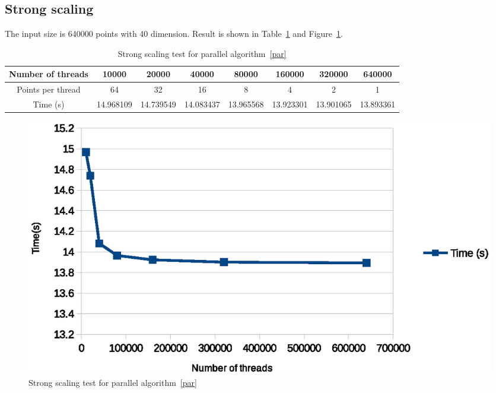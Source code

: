 \subsection{Strong scaling}
The input size is 640000 points with 40 dimension. Result is shown in Table~\ref{tab:strong-scaling} and
Figure~\ref{fig:strong_scaling}. 
\begin{table}[ht]
  \centering
  \begin{tabular}{|c|c|c|c|c|c|c|c|}
    \hline
    Number of threads	& 10000	    & 20000	    & 40000	& 80000	& 160000 & 320000	& 640000 \\
    \hline
    Points per thread &	64	      & 32	      & 16	  & 8	    & 4	     & 2	    & 1 \\
    \hline
    Time (s)	   & 14.968109 &	14.739549	& 14.083437	& 13.965568	& 13.923301	& 13.901065	& 13.893361\\
    \hline
  \end{tabular}
  \label{tab:strong-scaling}
  \caption{Strong scaling test for parallel algorithm~\ref{par}}
\end{table}
\begin{figure}[!h]
  \centering
  \includegraphics[width=\linewidth]{fig/strong_scaling}
  \caption{Strong scaling test for parallel algorithm~\ref{par}}
  \label{fig:strong_scaling}
\end{figure}

